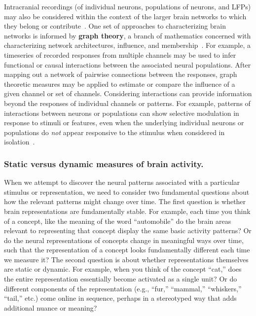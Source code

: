 \documentclass[runningheads]{llncs}
\begin{document}
Intracranial recordings (of individual neurons, populations of
neurons, and LFPs) may also be considered within the context of the
larger brain networks to which they belong or
contribute~\citep{BassSpor17}.  One set of approaches to
characterizing brain networks is informed by \textbf{graph theory}, a
branch of mathematics concerned with characterizing network
architectures, influence, and membership~\citep{BullSpor09,
  RubiSpor10, HoneEtal07, SporBetz16, SporHone06, BassBull06,
  BetzEtal17b, SizeEtal18, OwenEtal21}.  For example, a timeseries of
recorded responses from multiple channels may be used to infer
functional or causal interactions between the associated neural
populations.  After mapping out a network of pairwise connections
between the responses, graph theoretic measures may be applied to
estimate or compare the influence of a given channel or set of
channels.  Considering interactions can provide information beyond the
responses of individual channels or patterns.  For example, patterns
of interactions between neurons or populations can show selective
modulation in response to stimuli or features, even when the
underlying individual neurons or populations do \textit{not} appear
responsive to the stimulus when considered in
isolation~\citep{RigoEtal13}.



\subsubsection{Static versus dynamic measures of brain activity.}
When we attempt to discover the neural patterns associated with a
particular stimulus or representation, we need to consider two
fundamental questions about how the relevant patterns might change
over time.  The first question is whether brain representations are
fundamentally stable.  For example, each time you think of a concept,
like the meaning of the word ``automobile'' do the brain areas
relevant to representing that concept display the same basic activity
patterns?  Or do the neural representations of concepts change in
meaningful ways over time, such that the representation of a concept
looks fundamentally different each time we measure it?  The second
question is about whether representations themselves are static or
dynamic.  For example, when you think of the concept ``cat,'' does the
entire representation essentially become activated as a single unit?
Or do different components of the representation (e.g., ``fur,''
``mammal,'' ``whiskers,'' ``tail,'' etc.) come online in sequence,
perhaps in a stereotyped way that adds additional nuance or
meaning?
\end{document}
